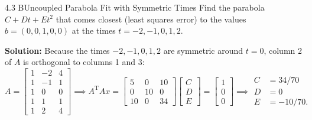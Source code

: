 \documentclass[11pt,a4paper,openany,oneside]{book}
\def\vect#1{#1}%
\def\uv#1{#1}%
\def\mathbf#1{#1}%
\newcommand{\vect}[1]{\mathbf{#1}}
\newcommand{\uv}[1]{\hat{\mathbf{#1}}}
\newcommand{\T}{\mathrm{T}}
\numberwithin{equation}{chapter}
\begin{document}
\begin{example}{4.3 B}{Uncoupled Parabola Fit with Symmetric Times}
Find the parabola $C + Dt + Et^2$ that comes closest (least squares error) to the values $\vect{b} = (0, 0, 1, 0, 0)$ at the times $t = -2, -1, 0, 1, 2$.
\end{example}
\textbf{Solution:} Because the times $-2,-1,0,1,2$ are symmetric around $t=0$, column 2 of $A$ is orthogonal to columns 1 and 3:
\[
A = \begin{bmatrix} 1 & -2 & 4 \\ 1 & -1 & 1 \\ 1 & 0 & 0 \\ 1 & 1 & 1 \\ 1 & 2 & 4 \end{bmatrix} \implies A^\T A\uv{\vect{x}} = \begin{bmatrix} 5 & 0 & 10 \\ 0 & 10 & 0 \\ 10 & 0 & 34 \end{bmatrix} \begin{bmatrix} C \\ D \\ E \end{bmatrix} = \begin{bmatrix} 1 \\ 0 \\ 0 \end{bmatrix} \implies \begin{aligned} C &= 34/70 \\ D &= 0 \\ E &= -10/70. \end{aligned}
\]
\end{document}
